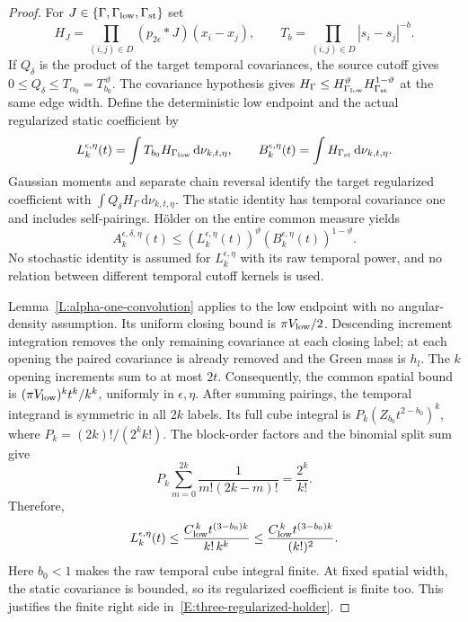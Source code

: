 \documentclass[12pt]{article}
\numberwithin{equation}{section}
\theoremstyle{definition}
\newcommand{\ud}{\,\mathrm{d}}
\begin{document}
\begin{proof}
  For $J\in\{\Gamma,\Gamma_{\rm low},\Gamma_{\rm st}\}$ set
  \[
    H_J=\prod_{(i,j)\in D}(p_{2\epsilon}*J)(x_i-x_j),\qquad
    T_b=\prod_{(i,j)\in D}|s_i-s_j|^{-b}.
  \]
  If $Q_\delta$ is the product of the target temporal covariances,
  the source cutoff gives $0\le Q_\delta\le T_{\alpha_0}
  =T_{b_0}^{\,\vartheta}$. The covariance hypothesis gives
  $H_\Gamma\le H_{\Gamma_{\rm low}}^\vartheta
  H_{\Gamma_{\rm st}}^{1-\vartheta}$ at the same edge width.
  Define the deterministic low endpoint and the actual regularized
  static coefficient by
  \[
    L_k^{\epsilon,\eta}(t)
    =\int T_{b_0}H_{\Gamma_{\rm low}}\ud\nu_{k,t,\eta},
    \qquad
    B_k^{\epsilon,\eta}(t)
    =\int H_{\Gamma_{\rm st}}\ud\nu_{k,t,\eta}.
  \]
  Gaussian moments and separate chain reversal identify the target
  regularized coefficient with $\int Q_\delta H_\Gamma
  \ud\nu_{k,t,\eta}$. The static identity has temporal covariance
  one and includes self-pairings. H\"older on the entire common measure
  yields
  \begin{equation}\label{E:three-regularized-holder}
    A_k^{\epsilon,\delta,\eta}(t)
    \le\left(L_k^{\epsilon,\eta}(t)\right)^\vartheta
    \left(B_k^{\epsilon,\eta}(t)\right)^{1-\vartheta}.
  \end{equation}
  No stochastic identity is assumed for $L_k^{\epsilon,\eta}$ with
  its raw temporal power, and no relation between different temporal
  cutoff kernels is used.

  Lemma~\ref{L:alpha-one-convolution} applies to the low endpoint
  with no angular-density assumption. Its uniform closing bound is
  $\pi V_{\rm low}/2$. Descending increment integration removes the
  only remaining covariance at each closing label; at each opening
  the paired covariance is already removed and the Green mass is $h_l$.
  The $k$ opening increments sum to at most $2t$. Consequently, the
  common spatial bound is $(\pi V_{\rm low})^kt^k/k^k$, uniformly in
  $\epsilon,\eta$. After summing pairings, the temporal integrand is
  symmetric in all $2k$ labels. Its full cube integral is
  $P_k(Z_{b_0}t^{2-b_0})^k$, where $P_k=(2k)!/(2^kk!)$.
  The block-order factors and the binomial split sum give
  \[
    P_k\sum_{m=0}^{2k}\frac1{m!(2k-m)!}=\frac{2^k}{k!}.
  \]
  Therefore,
  \begin{equation}\label{E:three-low-coefficient}
    L_k^{\epsilon,\eta}(t)
    \le\frac{C_{\rm low}^{\,k}t^{(3-b_0)k}}{k!\,k^k}
    \le\frac{C_{\rm low}^{\,k}t^{(3-b_0)k}}{(k!)^2}.
  \end{equation}
  Here $b_0<1$ makes the raw temporal cube integral finite. At fixed
  spatial width, the static covariance is bounded, so its regularized
  coefficient is finite too. This justifies the finite right side
  in~\eqref{E:three-regularized-holder}.


\end{proof}
\end{document}
